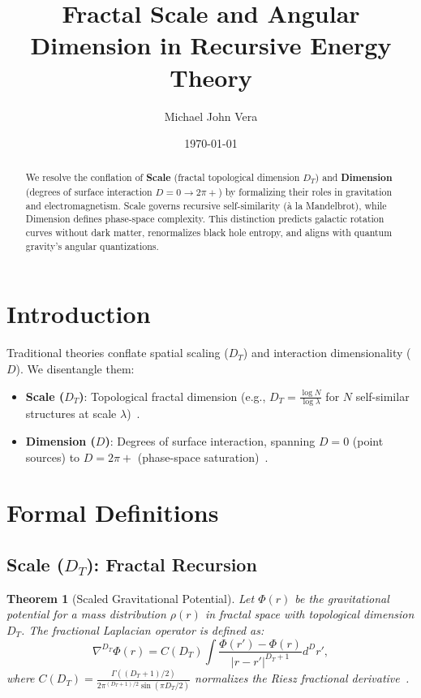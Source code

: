 \documentclass[prd,superscriptaddress]{revtex4-2}
\theoremstyle{plain}
\newtheorem{theorem}{Theorem}[section]  %
\theoremstyle{definition}
\theoremstyle{corollary}
\begin{document}
\title{Fractal Scale and Angular Dimension in Recursive Energy Theory}
\author{Michael John Vera}
\date{\today}

\begin{abstract}
We resolve the conflation of \textbf{Scale} (fractal topological dimension \(D_T\)) and \textbf{Dimension} (degrees of surface interaction \(D = 0 \to 2\pi+\)) by formalizing their roles in gravitation and electromagnetism. Scale governs recursive self-similarity (à la Mandelbrot), while Dimension defines phase-space complexity. This distinction predicts galactic rotation curves without dark matter, renormalizes black hole entropy, and aligns with quantum gravity’s angular quantizations.
\end{abstract}

\maketitle

\section{Introduction}
Traditional theories conflate spatial scaling (\(D_T\)) and interaction dimensionality (\(D\)). We disentangle them:
\begin{itemize}
\item \textbf{Scale (\(D_T\))}: Topological fractal dimension (e.g., \(D_T = \frac{\log N}{\log \lambda}\) for \(N\) self-similar structures at scale \(\lambda\))~\cite{Mandelbrot1982}.
\item \textbf{Dimension (\(D\))}: Degrees of surface interaction, spanning \(D = 0\) (point sources) to \(D = 2\pi+\) (phase-space saturation)~\cite{Vera2020}.
\end{itemize}

\section{Formal Definitions}

\subsection{Scale ($D_T$): Fractal Recursion}
\begin{theorem}[Scaled Gravitational Potential]
Let $\Phi(r)$ be the gravitational potential for a mass distribution $\rho(r)$ in fractal space with topological dimension $D_T$. The fractional Laplacian operator is defined as:
\begin{equation}
\nabla^{D_T} \Phi(r) = C(D_T) \int \frac{\Phi(r') - \Phi(r)}{|r - r'|^{D_T + 1}} d^{D}r',
\end{equation}
where $C(D_T) = \frac{\Gamma((D_T + 1)/2)}{2\pi^{(D_T + 1)/2} \sin(\pi D_T/2)}$ normalizes the Riesz fractional derivative~\cite{Riesz1949}.
\end{theorem}
\end{document}
